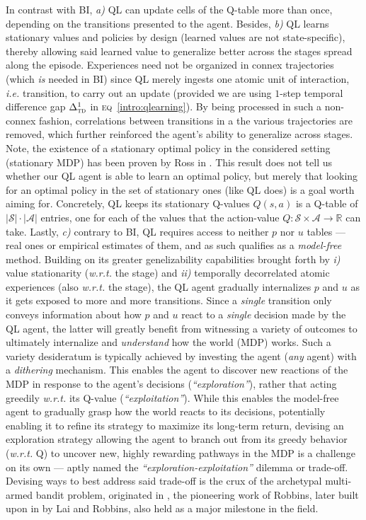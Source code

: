 In contrast with BI,
\textit{a)} QL can update cells of the Q-table more than once, depending on the transitions presented to the agent.
Besides, \textit{b)} QL learns stationary values and policies by design (learned values are not state-specific),
thereby allowing said learned value to generalize better across the stages spread along the episode.
Experiences need not be organized in connex trajectories (which \emph{is} needed in BI)
since QL merely ingests one atomic unit of interaction, \textit{i.e.} transition, to carry out an update
(provided we are using $1$-step temporal difference gap $\Delta_\textsc{td}^1$
in \textsc{eq}~\ref{intro:qlearning}).
By being processed in such a non-connex fashion, correlations between transitions in a the
various trajectories are removed, which further reinforced the agent's ability to generalize across stages.
Note, the existence of a stationary optimal policy in the considered setting (stationary MDP)
has been proven by Ross in \cite{Ross1983-oc}. This result does not tell us whether our QL agent is able to
learn an optimal policy, but merely that looking for an optimal policy in the set of stationary ones
(like QL does) is a goal worth aiming for.
Concretely, QL keeps its stationary Q-values $Q(s,a)$ is a Q-table of $|\mathcal{S}| \cdot |\mathcal{A}|$
entries, one for each of the values that the action-value $Q: \mathcal{S} \times \mathcal{A} \to \mathbb{R}$
can take.
Lastly, \textit{c)} contrary to BI,
QL requires access to neither $p$ nor $u$ tables --- real ones or empirical estimates of them,
and as such qualifies as a \emph{model-free} method.
Building on its greater genelizability capabilities brought forth by
\textit{i)} value stationarity (\textit{w.r.t.} the stage)
and \textit{ii)} temporally decorrelated atomic experiences (also \textit{w.r.t.} the stage),
the QL agent gradually internalizes $p$ and $u$ as it gets exposed to more and more transitions.
Since a \emph{single} transition only conveys information about how $p$ and $u$ react to a \emph{single}
decision made by the QL agent, the latter will greatly benefit from witnessing a variety of outcomes
to ultimately internalize and \emph{understand} how the world (MDP) works.
Such a variety desideratum is typically achieved by investing the agent (\textit{any} agent) with a
\emph{dithering} mechanism.
This enables the agent to discover new reactions of the MDP in response to the agent's decisions
(\textit{``exploration''}),
rather that acting greedily \textit{w.r.t.} its Q-value
(\textit{``exploitation''}).
While this enables the model-free agent to gradually grasp how the world reacts to its decisions,
potentially enabling it to refine its strategy to maximize its long-term return,
devising an exploration strategy allowing the agent to branch out from its greedy behavior (\textit{w.r.t.} Q)
to uncover new, highly rewarding pathways in the MDP is a challenge on its own
--- aptly named the \textit{``exploration-exploitation''} dilemma or trade-off.
Devising ways to best address said trade-off
is the crux of the archetypal multi-armed bandit problem, originated in \cite{Robbins1952-sp},
the pioneering work of Robbins,
later built upon in \cite{Lai1985-cb} by Lai and Robbins, also held as a major milestone in the field.

